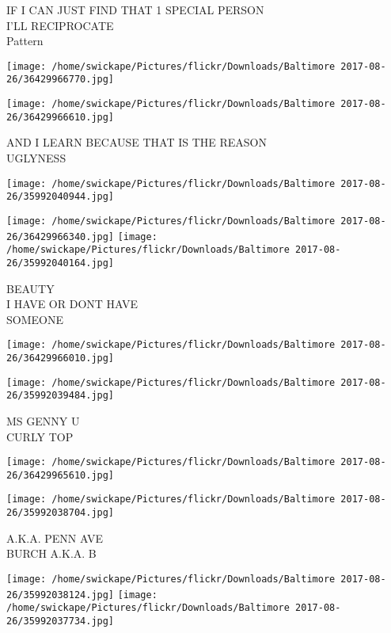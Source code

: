 \documentclass[10pt,letterpaper]{article}
\begin{document}
IF I CAN JUST FIND THAT 1 SPECIAL PERSON\\
I'LL RECIPROCATE\\
Pattern\\
\pagebreak

\texttt{[image: /home/swickape/Pictures/flickr/Downloads/Baltimore 2017-08-26/36429966770.jpg]}

\vspace{0.25in}
\texttt{[image: /home/swickape/Pictures/flickr/Downloads/Baltimore 2017-08-26/36429966610.jpg]}

AND I LEARN BECAUSE THAT IS THE REASON\\
UGLYNESS\\
\pagebreak

\texttt{[image: /home/swickape/Pictures/flickr/Downloads/Baltimore 2017-08-26/35992040944.jpg]}

\vspace{0.25in}
\texttt{[image: /home/swickape/Pictures/flickr/Downloads/Baltimore 2017-08-26/36429966340.jpg]}
\texttt{[image: /home/swickape/Pictures/flickr/Downloads/Baltimore 2017-08-26/35992040164.jpg]}

BEAUTY\\
I HAVE OR DONT HAVE\\
SOMEONE\\
\pagebreak

\texttt{[image: /home/swickape/Pictures/flickr/Downloads/Baltimore 2017-08-26/36429966010.jpg]}

\vspace{0.25in}
\texttt{[image: /home/swickape/Pictures/flickr/Downloads/Baltimore 2017-08-26/35992039484.jpg]}

MS GENNY U\\
CURLY TOP\\
\pagebreak

\texttt{[image: /home/swickape/Pictures/flickr/Downloads/Baltimore 2017-08-26/36429965610.jpg]}

\vspace{0.25in}
\texttt{[image: /home/swickape/Pictures/flickr/Downloads/Baltimore 2017-08-26/35992038704.jpg]}

A.K.A. PENN AVE\\
BURCH A.K.A. B\\
\pagebreak

\texttt{[image: /home/swickape/Pictures/flickr/Downloads/Baltimore 2017-08-26/35992038124.jpg]}
\texttt{[image: /home/swickape/Pictures/flickr/Downloads/Baltimore 2017-08-26/35992037734.jpg]}
\end{document}

